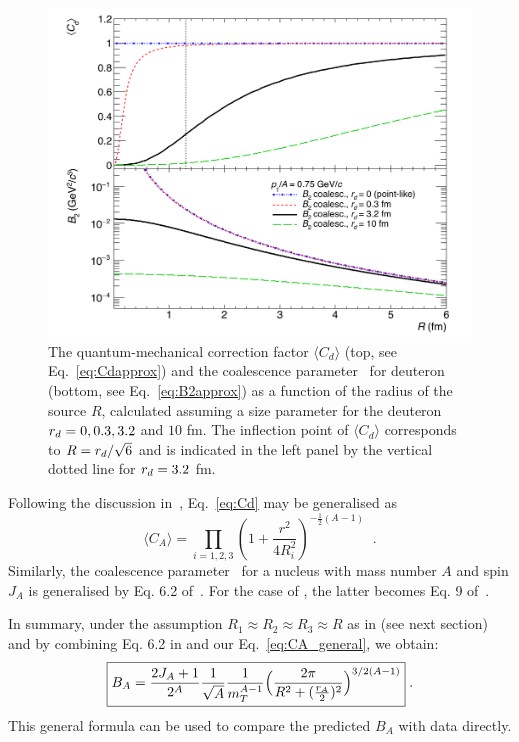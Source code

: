 \begin{figure}[hb]
\begin{center}
\includegraphics[width=\columnwidth]{theory_coalescence_Cd_B2_vert.png}
\caption{{The quantum-mechanical correction factor $\langle C_{d} \rangle$ (top, see Eq.~\ref{eq:Cdapprox}) and the coalescence parameter \btwo~for deuteron (bottom, see Eq.~\ref{eq:B2approx}) as a function of the radius of the source $R$, calculated assuming a size parameter for the deuteron $r_{d} = 0, 0.3, 3.2$ and $10$ fm. The inflection point of $\langle C_{d} \rangle$ corresponds to $R = r_{d}/\sqrt{6}$ and is indicated in the left panel by the vertical dotted line for $r_{d} = 3.2$ fm.}}
\label{fig:radiusDependence}
\end{center}
\end{figure}   

Following the discussion in~\cite{Blum:2017qnn}, Eq.~\ref{eq:Cd} may be generalised as 
%
\begin{equation}
\langle C_{A} \rangle = \prod_{i=1,2,3} \left(1 + \frac{r^2}{4R_{i}^2} \right)^{-\frac{1}{2}(A-1)} \;\; .
\label{eq:CA_general}
\end{equation}
%
Similarly, the coalescence parameter \bA~for a nucleus with mass number $A$ and spin $J_{A}$ is generalised by Eq. 6.2 of~\cite{Scheibl:1998tk}.
For the case of \hethree, the latter becomes Eq. 9 of~\cite{Blum:2017qnn}.

In summary, under the assumption $R_1\approx R_2 \approx R_3 \approx R$ as in \cite{Blum:2017qnn} (see next section) and by combining Eq. 6.2 in \cite{Scheibl:1998tk} and our Eq.~\ref{eq:CA_general}, we obtain:
%
\begin{equation}
	\boxed {  B_{A} = {2J_{A} + 1 \over 2^{A}} {1 \over \sqrt{A}} {1 \over m_{T}^{A-1}} \Bigl({2\pi \over R^2 + ({r_A \over 2})^2 }\Bigr)^{3/2(A-1)} } \;.
\end{equation}
%
This general formula can be used to compare the predicted $B_{A}$ with data directly.
 
